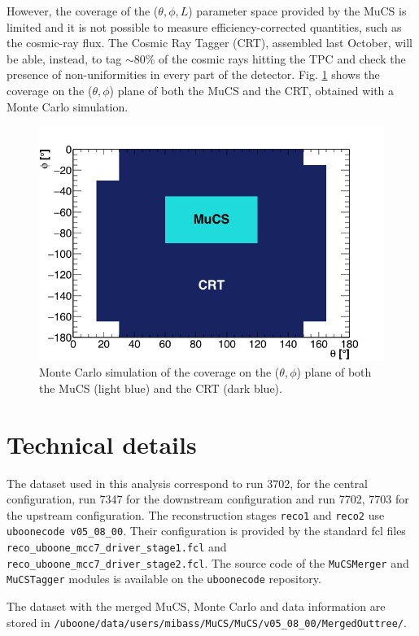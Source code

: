 \documentclass[a4paper]{scrartcl}
\begin{document}
However, the coverage of the ($\theta, \phi, L$) parameter space provided by the MuCS is limited and it is not possible to measure efficiency-corrected quantities, such as the cosmic-ray flux. The Cosmic Ray Tagger (CRT), assembled last October, will be able, instead, to tag $\sim$80\% of the cosmic rays hitting the TPC and check the presence of non-uniformities in every part of the detector. Fig. \ref{fig:crt} shows the coverage on the ($\theta,\phi$) plane of both the MuCS and the CRT, obtained with a Monte Carlo simulation.

\begin{figure}[htbp]
  \begin{center}
    \includegraphics[width=0.7\linewidth]{figures/crt.png}
    \caption{Monte Carlo simulation of the coverage on the ($\theta,\phi$) plane of both the MuCS (light blue) and the CRT (dark blue).} \label{fig:crt}
  \end{center}
\end{figure}

\clearpage{}

\appendix

\section{Technical details}
The dataset used in this analysis correspond to run 3702, for the central configuration, run 7347 for the downstream configuration and run 7702, 7703 for the upstream configuration. The reconstruction stages \texttt{reco1} and \texttt{reco2} use \texttt{uboonecode v05\_08\_00}. Their configuration is provided by the standard fcl files \texttt{reco\_uboone\_mcc7\_driver\_stage1.fcl} and \texttt{reco\_uboone\_mcc7\_driver\_stage2.fcl}. The source code of the \texttt{MuCSMerger} and \texttt{MuCSTagger} modules is available on the \texttt{uboonecode} repository.

The dataset with the merged MuCS, Monte Carlo and data information are stored in \texttt{/uboone/data/users/mibass/MuCS/MuCS/v05\_08\_00/MergedOuttree/}.
\end{document}
